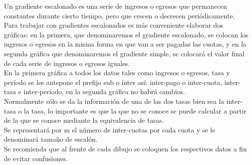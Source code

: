 Un gradiente escalonado es una serie de ingresos o egresos que permanecen constantes durante cierto tiempo, pero 	que crecen o decrecen periódicamente.\\

Para trabajar con gradientes escalonados es más conveniente elaborar dos gráficas: en la primera, que denominaremos el gradiente escalonado, se colocan los ingresos o egresos en la misma forma en que van a ser pagadas las cuotas, y en la segunda gráfica que denominaremos el gradiente simple, se colocará el valor final de cada serie de ingresos o egresos iguales.\\

En la primera gráfica a todos los datos tales como ingresos o egresos, tasa y período se les antepone  el prefijo sub o ínter así: inter-pago o inter-cuota, inter-tasa e inter-período, en la segunda gráfica no habrá cambios.\\

Normalmente sólo se da la información de una de las dos tasas bien sea la inter-tasa o la tasa, lo importante es que la que no se conoce se puede calcular a partir de la que se conoce mediante la equivalencia de tasas.\\

Se representará por m el número de inter-cuotas por cada cuota y se le denominará tamaño de escalón.\\

Se recomienda que al frente de cada dibujo se coloquen los respectivos datos a fin de evitar confusiones.\\




\cleardoublepage
{}
\setlength{\columnsep}{0.75cm}
\printindex

